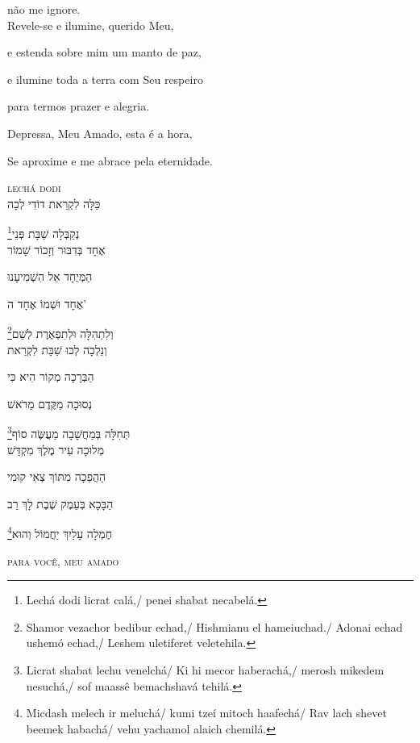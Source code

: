 não me ignore.\\[10pt]

Revele-se e ilumine, querido Meu,

e estenda sobre mim um manto de paz,

e ilumine toda a terra com Seu respeiro

para termos prazer e alegria. 

Depressa, {Meu Amado}, esta é a hora,

Se aproxime e me abrace pela eternidade.

\movetoevenpage
\raggedleft
{}

\vspace*{1cm}

\textsc{lechá dodi}\\[15pt]

כַּלָּה לִקְרַאת דוֹדִי לְכָה

\footnote{Lechá dodi licrat calá,/ penei shabat necabelá.}נְקַבְּלָה שַׁבָּת פְּנֵי\\[10pt]

אֶחָד בְּדִבּוּר וְזָכוֹר שָׁמוֹר

הַמְּיֻחָד אֵל הִשְׁמִיעָנוּ

אֶחָד וּשְׁמוֹ אֶחָד ה' 

\footnote{Shamor vezachor bedibur echad,/ Hishmianu el hameiuchad./ Adonai echad ushemó echad,/ Leshem uletiferet veletehila.}וְלִתְהִלָּה וּלְתִפְאֶרֶת לְשֵׁם\\[10pt]

וְנֵלְכָה לְכוּ שַׁבָּת לִקְרַאת

הַבְּרָכָה מְקוֹר הִיא כִּי

נְסוּכָה מִקֶּדֶם מֵרֹאשׁ 

\footnote{Licrat shabat lechu venelchá/ Ki hi mecor haberachá,/ merosh mikedem nesuchá,/ sof maassê bemachshavá tehilá.}תְּחִלָּה בְּמַחֲשָׁבָה מַעֲשֶּׂה סוֹף\\[10pt]

מְלוּכָה עִיר מֶלֶךְ  מִקְדַּשׁ

הַהֲפֵכָה מִתּוֹךְ צְאִי קוּמִי 

הַבָּכָא בְּעֵמֶק שֶׁבֶת  לָךְ רַב

\footnote{Micdash melech ir meluchá/ kumi tzeí mitoch haafechá/ 
   Rav lach shevet beemek habachá/ vehu yachamol alaich chemilá.}חֶמְלָה עָלַיִךְ יַחֲמוֹל  וְהוּא\\[10pt]

\movetooddpage
\raggedright

\vspace*{1cm}
\textsc{para você, meu amado}\\[15pt]



